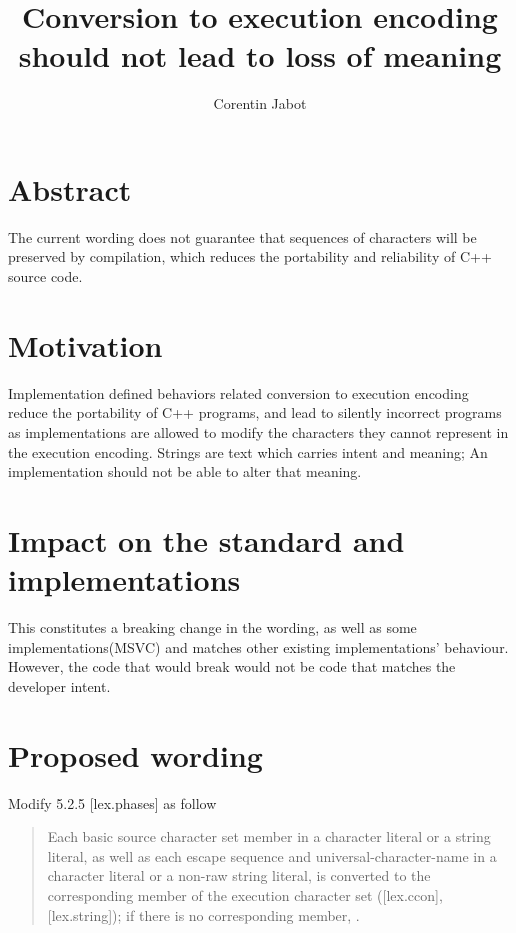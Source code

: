 \documentclass{wg21}
\title{Conversion to execution encoding should not lead to loss of meaning}
\author{Corentin Jabot}{corentin.jabot@gmail.com}
\begin{document}
\maketitle



\section{Abstract}

The current wording does not guarantee that sequences of characters will be preserved by compilation, which reduces the portability and reliability of
C++ source code.  

\section{Motivation}

Implementation defined behaviors related conversion to execution encoding reduce the portability of C++ programs, and lead to silently incorrect
programs as implementations are allowed to modify the characters they cannot represent in the execution encoding.
Strings are text which carries intent and meaning;  An implementation should not be able to alter that meaning.

\section{Impact on the standard and implementations}

This constitutes a breaking change in the wording, as well as some implementations(MSVC) and matches other existing implementations' behaviour.
However, the code that would break would not be code that matches the developer intent. 

\section{Proposed wording}


Modify 5.2.5 [lex.phases] as follow

\begin{quote}

Each basic source character set member in a character literal or a string literal, as well as each escape sequence and universal-character-name in a character literal or a non-raw string literal, is converted to the corresponding member of the execution character set ([lex.ccon], [lex.string]); if there is no corresponding member, .

\end{quote}
\end{document}
